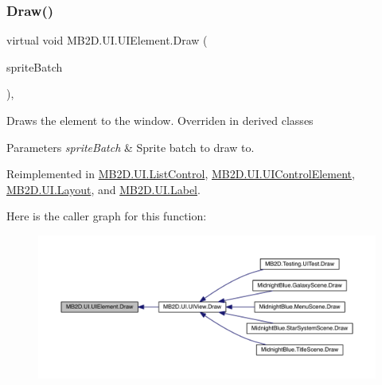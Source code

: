 \subsubsection{\texorpdfstring{Draw()}{Draw()}}
{\footnotesize\ttfamily virtual void M\+B2\+D.\+U\+I.\+U\+I\+Element.\+Draw (\begin{DoxyParamCaption}\item[{Sprite\+Batch}]{sprite\+Batch }\end{DoxyParamCaption})\hspace{0.3cm}{\ttfamily [inline]}, {\ttfamily [virtual]}}



Draws the element to the window. Overriden in derived classes 


\begin{DoxyParams}{Parameters}
{\em sprite\+Batch} & Sprite batch to draw to.\\
\hline
\end{DoxyParams}


Reimplemented in \hyperlink{class_m_b2_d_1_1_u_i_1_1_list_control_a2ec92a77d8960945f3bd37bd76641946}{M\+B2\+D.\+U\+I.\+List\+Control}, \hyperlink{class_m_b2_d_1_1_u_i_1_1_u_i_control_element_afac0cbbbbead7c7348401075cda433ba}{M\+B2\+D.\+U\+I.\+U\+I\+Control\+Element}, \hyperlink{class_m_b2_d_1_1_u_i_1_1_layout_ae018eee922839254b46610216843afa7}{M\+B2\+D.\+U\+I.\+Layout}, and \hyperlink{class_m_b2_d_1_1_u_i_1_1_label_a976ec212cedf0710fb35cd578e1e51b1}{M\+B2\+D.\+U\+I.\+Label}.

Here is the caller graph for this function\+:
\nopagebreak
\begin{figure}[H]
\begin{center}
\leavevmode
\includegraphics[width=350pt]{class_m_b2_d_1_1_u_i_1_1_u_i_element_afec98e6e38cb0dbc17a5db6d6a3d5ba5_icgraph}
\end{center}
\end{figure}
\hypertarget{class_m_b2_d_1_1_u_i_1_1_u_i_element_a0a17b121a60ad05039f01eee006ae76c}{}\label{class_m_b2_d_1_1_u_i_1_1_u_i_element_a0a17b121a60ad05039f01eee006ae76c} 
